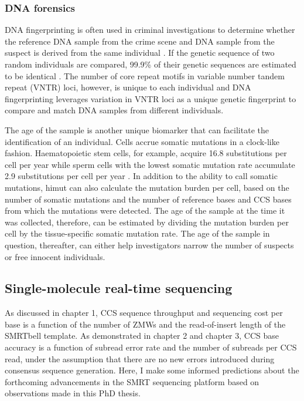 \subsubsection{DNA forensics}

DNA fingerprinting is often used in criminal investigations to determine whether the reference DNA sample from the crime scene and DNA sample from the suspect is derived from the same individual \cite{Gill1985-dt}. If the genetic sequence of two random individuals are compared, 99.9\% of their genetic sequences are estimated to be identical \cite{1000_Genomes_Project_Consortium2012-rj}. The number of core repeat motifs in variable number tandem repeat (VNTR) loci, however, is unique to each individual and DNA fingerprinting leverages variation in VNTR loci as a unique genetic fingerprint to compare and match DNA samples from different individuals. 

The age of the sample is another unique biomarker that can facilitate the identification of an individual. Cells accrue somatic mutations in a clock-like fashion. Haematopoietic stem cells, for example, acquire 16.8 substitutions per cell per year \cite{Osorio2018-mh, Mitchell2022-ry} while sperm cells with the lowest somatic mutation rate accumulate 2.9 substitutions per cell per year \cite{Rahbari2016-ot}. In addition to the ability to call somatic mutations, himut can also calculate the mutation burden per cell, based on the number of somatic mutations and the number of reference bases and CCS bases from which the mutations were detected. The age of the sample at the time it was collected, therefore, can be estimated by dividing the mutation burden per cell by the tissue-specific somatic mutation rate. The age of the sample in question, thereafter, can either help investigators narrow the number of suspects or free innocent individuals.  

\subsection{Single-molecule real-time sequencing}

As discussed in chapter 1, CCS sequence throughput and sequencing cost per base is a function of the number of ZMWs and the read-of-insert length of the SMRTbell template. As demonstrated in chapter 2 and chapter 3, CCS base accuracy is a function of subread error rate and the number of subreads per CCS read, under the assumption that there are no new errors introduced during consensus sequence generation. Here, I make some informed predictions about the forthcoming advancements in the SMRT sequencing platform based on observations made in this PhD thesis.

